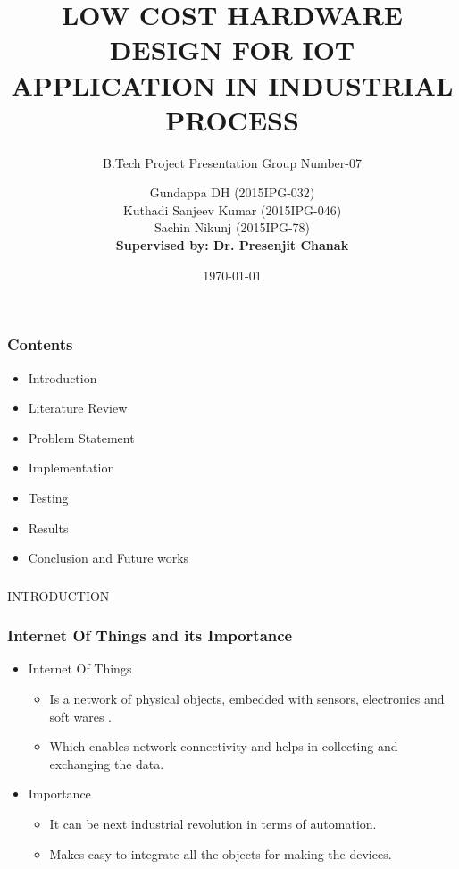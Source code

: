 \documentclass{beamer}
\title[IIT Roorkee]{LOW COST HARDWARE DESIGN FOR IOT
APPLICATION IN INDUSTRIAL PROCESS}
\author{B.Tech Project Presentation Group Number-07}
\author{Gundappa DH (2015IPG-032)\\
        Kuthadi Sanjeev Kumar (2015IPG-046)\\
        Sachin Nikunj (2015IPG-78)\\
\vspace{6mm}
\textbf{Supervised by: Dr. Presenjit Chanak}}
\institute[]{
	
	ABV-Indian Institute of Information Technology and\\
	Management, Gwalior
}
\date{\today}
\begin{document}
	\frame{\titlepage}
	
	
	\begin{frame}\frametitle{Contents}
	\begin{itemize}
		\item	Introduction
		\item   Literature Review
		\item   Problem Statement 
		\item	Implementation  
		\item   Testing
		\item	Results
		\item   Conclusion and Future works
	\end{itemize}
\end{frame}
\begin{frame}\frametitle{}
\Huge
\begin{center}INTRODUCTION \end{center}
\end{frame}

\begin{frame}\frametitle{Internet Of Things and its Importance }
\begin{itemize}

\item	Internet Of Things
\begin{itemize}
	\item Is a network of physical objects, embedded with sensors, electronics and soft wares .	 
	\item Which enables network connectivity and helps in collecting and exchanging the data.	  
\end{itemize}
\item Importance
\begin{itemize}
	\item It can be next industrial revolution in terms of automation. 
	\item Makes easy to integrate all the objects for making the devices.
\end{itemize}
\end{itemize}
\end{frame}
\end{document}
